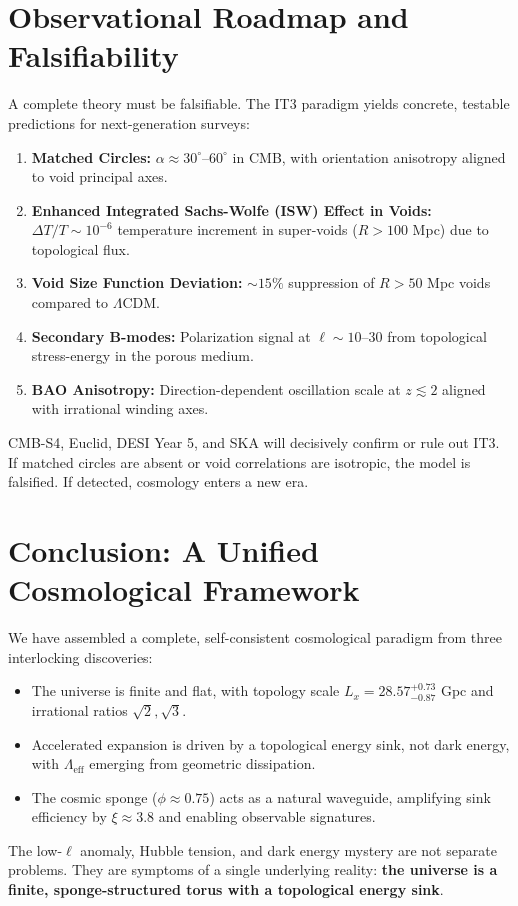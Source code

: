 \documentclass[12pt,a4paper]{article}
\begin{document}
\section{Observational Roadmap and Falsifiability}

A complete theory must be falsifiable. The IT3 paradigm yields concrete, testable predictions for next-generation surveys:
\begin{enumerate}
    \item \textbf{Matched Circles:} $\alpha \approx 30^\circ\text{--}60^\circ$ in CMB, with orientation anisotropy aligned to void principal axes.
    \item \textbf{Enhanced Integrated Sachs-Wolfe (ISW) Effect in Voids:} $\Delta T/T \sim 10^{-6}$ temperature increment in super-voids ($R > 100$ Mpc) due to topological flux.
    \item \textbf{Void Size Function Deviation:} $\sim 15\%$ suppression of $R > 50$ Mpc voids compared to $\Lambda$CDM.
    \item \textbf{Secondary B-modes:} Polarization signal at $\ell \sim 10\text{--}30$ from topological stress-energy in the porous medium.
    \item \textbf{BAO Anisotropy:} Direction-dependent oscillation scale at $z \lesssim 2$ aligned with irrational winding axes.
\end{enumerate}
CMB-S4, Euclid, DESI Year 5, and SKA will decisively confirm or rule out IT3. If matched circles are absent or void correlations are isotropic, the model is falsified. If detected, cosmology enters a new era.

\section{Conclusion: A Unified Cosmological Framework}

We have assembled a complete, self-consistent cosmological paradigm from three interlocking discoveries:
\begin{itemize}
    \item The universe is finite and flat, with topology scale $L_x = 28.57^{+0.73}_{-0.87}$ Gpc and irrational ratios $\sqrt{2}, \sqrt{3}$.
    \item Accelerated expansion is driven by a topological energy sink, not dark energy, with $\Lambda_{\text{eff}}$ emerging from geometric dissipation.
    \item The cosmic sponge ($\phi \approx 0.75$) acts as a natural waveguide, amplifying sink efficiency by $\xi \approx 3.8$ and enabling observable signatures.
\end{itemize}
The low-$\ell$ anomaly, Hubble tension, and dark energy mystery are not separate problems. They are symptoms of a single underlying reality: \textbf{the universe is a finite, sponge-structured torus with a topological energy sink}. 
\end{document}
